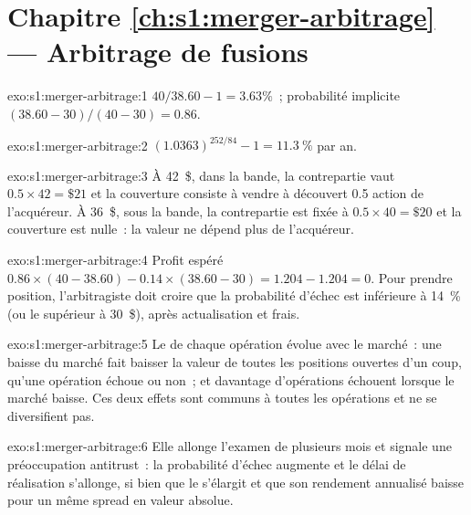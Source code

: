 \section*{Chapitre \ref{ch:s1:merger-arbitrage} --- Arbitrage de fusions}

\begin{solution}{exo:s1:merger-arbitrage:1}
 $40/38.60 - 1 = 3.63\%$~; probabilité implicite $(38.60 - 30)/(40 - 30) = 0.86$.
\end{solution}

\begin{solution}{exo:s1:merger-arbitrage:2}
$(1.0363)^{252/84} - 1 = 11.3~\%$ par an.
\end{solution}

\begin{solution}{exo:s1:merger-arbitrage:3}
À 42~\$, dans la bande, la contrepartie vaut $0.5 \times 42 = \$21$ et la couverture consiste à vendre à découvert 0.5 action de l'acquéreur. À 36~\$, sous la bande, la contrepartie est
fixée à $0.5 \times 40 = \$20$ et la couverture est nulle~: la valeur ne dépend plus de l'acquéreur.
\end{solution}

\begin{solution}{exo:s1:merger-arbitrage:4}
Profit espéré $0.86 \times (40 - 38.60) - 0.14 \times (38.60 - 30) = 1.204 - 1.204 = 0$. Pour prendre position, l'arbitragiste doit croire que la probabilité d'échec est inférieure à
14~\% (ou le  supérieur à 30~\$), après actualisation et frais.
\end{solution}

\begin{solution}{exo:s1:merger-arbitrage:5}
Le  de chaque opération évolue avec le marché~: une baisse du marché fait baisser la valeur de toutes les positions ouvertes d'un coup, qu'une opération échoue ou non~; et davantage d'opérations échouent
lorsque le marché baisse. Ces deux effets sont communs à toutes les opérations et ne se diversifient pas.
\end{solution}

\begin{solution}{exo:s1:merger-arbitrage:6}
Elle allonge l'examen de plusieurs mois et signale une préoccupation antitrust~: la probabilité d'échec augmente et le délai de réalisation s'allonge, si bien que le  s'élargit et que son
rendement annualisé baisse pour un même spread en valeur absolue.
\end{solution}

